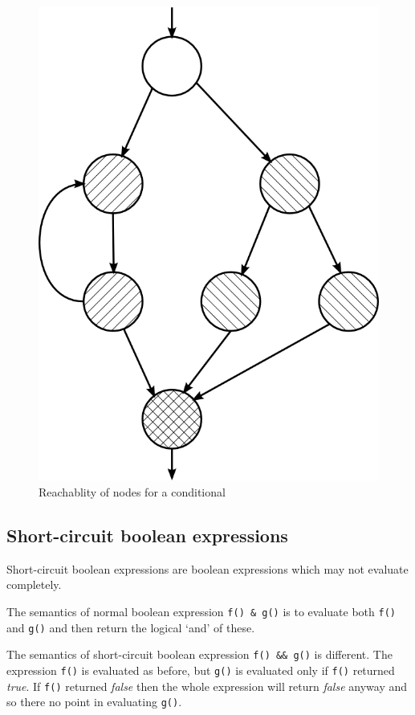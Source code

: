 \documentclass[12pt,twoside,notitlepage]{report}
\begin{document}
\begin{figure}[tbhp]
\centerline{\includegraphics{figs/IfThenElseRechablility.png}}
\caption{\label{IfThenElseRechablility}Reachablity of nodes for a conditional}
\end{figure}

\subsection{Short-circuit boolean expressions}

Short-circuit boolean expressions are boolean expressions
which may not evaluate completely.

The semantics of normal boolean expression \verb|f() & g()| is
to evaluate both \verb|f()| and \verb|g()| and then return
the logical `and' of these.

The semantics of short-circuit boolean expression \verb|f() && g()|
is different.  The expression \verb|f()| is evaluated as before,
but \verb|g()| is evaluated only if \verb|f()| returned \emph{true}.
If \verb|f()| returned \emph{false} then the whole expression
will return \emph{false} anyway and so there no point in evaluating
\verb|g()|.
\end{document}
